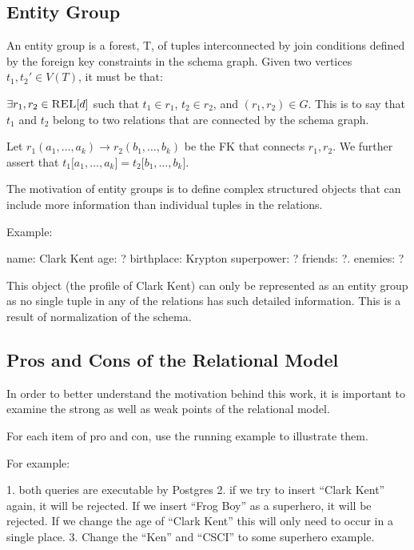 	\subsection{Entity Group}
		\begin{defn}
			An entity group is a forest, T,  of tuples interconnected by join conditions defined by the foreign key constraints in the schema graph.  Given two vertices $t_1, t_2'\in V\left(T\right)$, it must be that:

			$\exists r_1, r_2\in \textsc{REL}\lbrack d\rbrack$ such that $t_1 \in r_1$, $t_2\in r_2$, and $\left(r_1, r_2\right)\in G$.  This is to say that $t_1$ and $t_2$ belong to two relations that are connected by the schema graph.

			Let $r_1\left(a_1, \dotsc, a_k\right) \to r_2\left(b_1, \dotsc, b_k\right)$ be the FK that connects $r_1, r_2$.  We further assert that $t_1\lbrack a_1, \dotsc, a_k\rbrack = t_2\lbrack b_1, \dotsc, b_k\rbrack$.
		\end{defn}
		
		The motivation of entity groups is to define complex structured objects that can include more information than individual tuples in the relations.
		
		Example:
		
		name: Clark Kent
		age: ?
		birthplace: Krypton
		superpower: ?
		friends: ?.
		enemies: ?
		
		This object (the profile of Clark Kent) can only be represented as an entity group as no single tuple in any of the relations has such detailed information.  This is a result of normalization of the schema.

	\subsection{Pros and Cons of the Relational Model}
		In order to better understand the motivation behind this work, it is important to examine the strong as well as weak points of the relational model.
		
		For each item of pro and con, use the running example to illustrate them.
		
		For example:
		
		1. both queries are executable by Postgres
		2. if we try to insert ``Clark Kent'' again, it will be rejected.  If we insert ``Frog Boy'' as a superhero, it will be rejected.  If we change the age of ``Clark Kent'' this will only need to occur in a single place.
		3. Change the ``Ken'' and ``CSCI'' to some superhero example.
		
